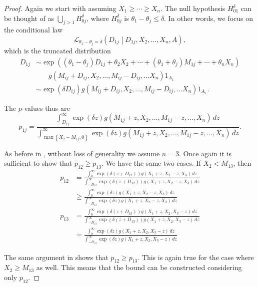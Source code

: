 \documentclass[11pt]{article}
\begin{document}
\begin{proof}

Again we start with assuming $X_1 \ge \cdots \ge X_n$. The null hypothesis $H_{01}^\delta$ can be thought of as $\bigcup_{j > 1} H_{0j}^\delta$, where $H_{0j}^\delta$ is $\theta_1 - \theta_j \le \delta$. In other words, we focus on the conditional law
$$\mathcal{L}_{\theta_1 - \theta_j = \delta} \left(D_{1j} \middle| D_{1j}, X_2, \ldots, X_n, A\right),$$
which is the truncated distribution
\begin{align*}
D_{1j} & \sim \exp\left(\left(\theta_1 - \theta_j\right) D_{1j} + \theta_2 X_2 + \cdots + \left(\theta_1 + \theta_j\right) M_{1j} + \cdots + \theta_n X_n \right) \\
& ~~~~~~~~ g\left(M_{ij} + D_{ij}, X_2, \ldots, M_{ij} - D_{ij}, \ldots X_n\right) 1_{A_1} \\
& \sim \exp\left(\delta D_{ij}\right) g\left(M_{ij} + D_{ij}, X_2, \ldots, M_{ij} - D_{ij}, \ldots X_n\right) 1_{A_1}.
\end{align*}

The $p$-values thus are
$$p_{1j} = \frac{\int_{D_{1j}}^\infty \exp\left(\delta z\right) g\left(M_{1j} + z, X_2, \ldots, M_{1j} - z, \ldots, X_n\right) \,dz}{\int_{\max\left\{X_2 - M_{1j}, 0\right\}}^\infty \exp\left(\delta z\right) g\left(M_{1j} + z, X_2, \ldots, M_{1j} - z, \ldots, X_n\right) \,dz}.$$

As before in , without loss of generality we assume $n = 3$. Once again it is sufficient to show that $p_{12} \ge p_{13}$. We have the same two cases. If $X_2 < M_{13}$, then
\begin{align*}
p_{12} & = \frac{\int_0^\infty \exp\left(\delta \left(z + D_{12}\right)\right) g\left(X_1 + z, X_2 - z, X_3\right) \,dz}{\int_{-D_{12}}^\infty \exp\left(\delta \left(z + D_{12}\right)\right) g\left(X_1 + z, X_2 - z, X_3\right) \,dz} \\
& \ge \frac{\int_0^\infty \exp\left(\delta z\right) g\left(X_1 + z, X_2 - z, X_3\right) \,dz}{\int_{-D_{13}}^\infty \exp\left(\delta z\right) g\left(X_1 + z, X_2 - z, X_3\right) \,dz} \\
p_{13} & = \frac{\int_0^\infty \exp\left(\delta \left(z + D_{13}\right)\right) g\left(X_1 + z, X_2, X_3 - z\right) \,dz}{\int_{-D_{13}}^\infty \exp\left(\delta \left(z + D_{13}\right)\right) g\left(X_1 + z, X_2, X_3 - z\right) \,dz} \\
& = \frac{\int_0^\infty \exp\left(\delta z\right) g\left(X_1 + z, X_2, X_3 - z\right) \,dz}{\int_{-D_{13}}^\infty \exp\left(\delta z\right) g\left(X_1 + z, X_2, X_3 - z\right) \,dz}
\end{align*}

The same argument in  shows that $p_{12} \ge p_{13}$. This is again true for the case where $X_2 \ge M_{13}$ as well. This means that the bound can be constructed considering only $p_{12}$.

\end{proof}
\end{document}

